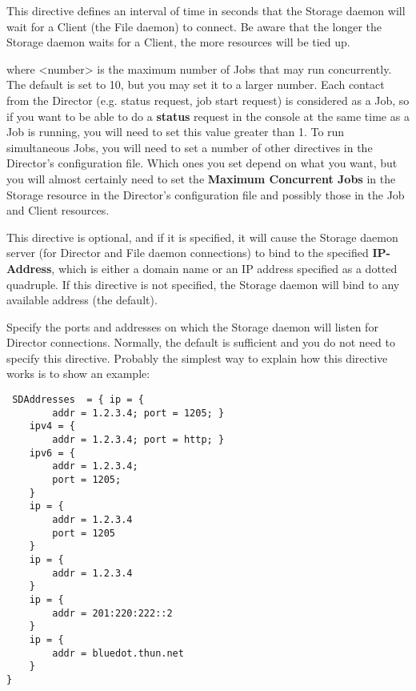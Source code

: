 \begin{description}
This directive defines an interval of time in seconds that
the Storage daemon will wait for a Client (the File daemon)
to connect.  Be aware that the
longer the Storage daemon waits for a Client, the more
resources will be tied up.

where {\textless}number{\textgreater} is the maximum number of Jobs that may run
concurrently.  The default is set to 10, but you may set it to a larger
number.  Each contact from the Director (e.g.  status request, job start
request) is considered as a Job, so if you want to be able to do a {\bf
status} request in the console at the same time as a Job is running, you
will need to set this value greater than 1.  To run simultaneous Jobs,
you will need to set a number of other directives in the Director's
configuration file.  Which ones you set depend on what you want, but you
will almost certainly need to set the {\bf Maximum Concurrent Jobs} in
the Storage resource in the Director's configuration file and possibly
those in the Job and Client resources.

This directive is optional, and if it is specified, it will cause the
Storage daemon server (for Director and File daemon connections) to bind
to the specified {\bf IP-Address}, which is either a domain name or an
IP address specified as a dotted quadruple.  If this directive is not
specified, the Storage daemon will bind to any available address (the
default).

Specify the ports and addresses on which the Storage daemon will listen
for Director connections.  Normally, the default is sufficient and you
do not need to specify this directive.  Probably the simplest way to
explain how this directive works is to show an example:

\footnotesize
\begin{verbatim}
 SDAddresses  = { ip = {
        addr = 1.2.3.4; port = 1205; }
    ipv4 = {
        addr = 1.2.3.4; port = http; }
    ipv6 = {
        addr = 1.2.3.4;
        port = 1205;
    }
    ip = {
        addr = 1.2.3.4
        port = 1205
    }
    ip = {
        addr = 1.2.3.4
    }
    ip = {
        addr = 201:220:222::2
    }
    ip = {
        addr = bluedot.thun.net
    }
}
\end{verbatim}
\normalsize


\end{description}
